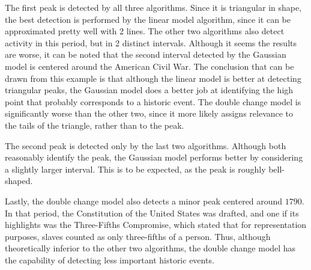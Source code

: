 The first peak is detected by all three algorithms. Since it is triangular in shape, the best detection is performed by the linear model algorithm, since it can be approximated pretty well with 2 lines. The other two algorithms also detect activity in this period, but in 2 distinct intervals. Although it seems the results are worse, it can be noted that the second interval detected by the Gaussian model is centered around the American Civil War. The conclusion that can be drawn from this example is that although the linear model is better at detecting triangular peaks, the Gaussian model does a better job at identifying the high point that probably corresponds to a historic event. The double change model is significantly worse than the other two, since it more likely assigns relevance to the tails of the triangle, rather than to the peak.

The second peak is detected only by the last two algorithms. Although both reasonably identify the peak, the Gaussian model performs better by considering a slightly larger interval. This is to be expected, as the peak is roughly bell-shaped.

Lastly, the double change model also detects a minor peak centered around $1790$. In that period, the Constitution of the United States was drafted, and one if its highlights was the Three-Fifths Compromise, which stated that for representation purposes, slaves counted as only three-fifths of a person. Thus, although theoretically inferior to the other two algorithms, the double change model has the capability of detecting less important historic events.
